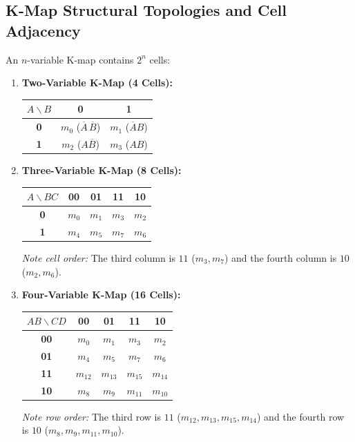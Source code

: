 \subsection{K-Map Structural Topologies and Cell Adjacency}
An $n$-variable K-map contains $2^n$ cells:
\begin{enumerate}[label=\bfseries\arabic*.]
    \item \textbf{Two-Variable K-Map (4 Cells):}
    \begin{center}
    \small
    \begin{tabular}{|c|c|c|}
    \hline
    $A \backslash B$ & \textbf{0} & \textbf{1} \\
    \hline
    \textbf{0} & $m_0$ ($\overline{A}\,\overline{B}$) & $m_1$ ($\overline{A}B$) \\
    \hline
    \textbf{1} & $m_2$ ($A\overline{B}$) & $m_3$ ($AB$) \\
    \hline
    \end{tabular}
    \end{center}
    \item \textbf{Three-Variable K-Map (8 Cells):}
    \begin{center}
    \small
    \begin{tabular}{|c|c|c|c|c|}
    \hline
    $A \backslash BC$ & \textbf{00} & \textbf{01} & \textbf{11} & \textbf{10} \\
    \hline
    \textbf{0} & $m_0$ & $m_1$ & $m_3$ & $m_2$ \\
    \hline
    \textbf{1} & $m_4$ & $m_5$ & $m_7$ & $m_6$ \\
    \hline
    \end{tabular}
    \end{center}
    \textit{Note cell order:} The third column is $11$ ($m_3, m_7$) and the fourth column is $10$ ($m_2, m_6$).
    \item \textbf{Four-Variable K-Map (16 Cells):}
    \begin{center}
    \small
    \begin{tabular}{|c|c|c|c|c|}
    \hline
    $AB \backslash CD$ & \textbf{00} & \textbf{01} & \textbf{11} & \textbf{10} \\
    \hline
    \textbf{00} & $m_0$ & $m_1$ & $m_3$ & $m_2$ \\
    \hline
    \textbf{01} & $m_4$ & $m_5$ & $m_7$ & $m_6$ \\
    \hline
    \textbf{11} & $m_{12}$ & $m_{13}$ & $m_{15}$ & $m_{14}$ \\
    \hline
    \textbf{10} & $m_8$ & $m_9$ & $m_{11}$ & $m_{10}$ \\
    \hline
    \end{tabular}
    \end{center}
    \textit{Note row order:} The third row is $11$ ($m_{12}, m_{13}, m_{15}, m_{14}$) and the fourth row is $10$ ($m_8, m_9, m_{11}, m_{10}$).
\end{enumerate}

